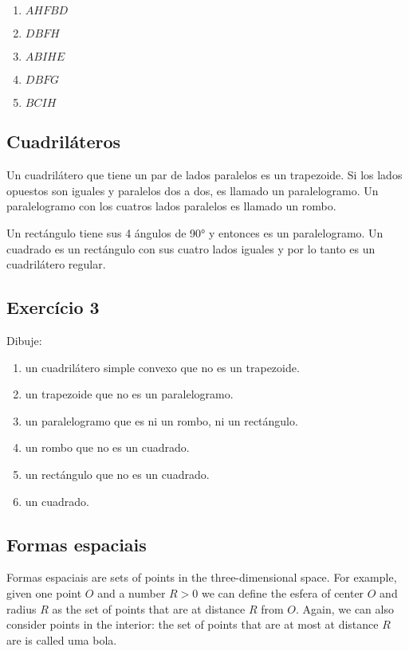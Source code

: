 \begin{enumerate}
  \item $AHFBD$
  \item $DBFH$
  \item $ABIHE$
  \item $DBFG$
  \item $BCIH$
\end{enumerate}

\subsection*{Cuadriláteros}

Un cuadrilátero que tiene un par de lados paralelos es un trapezoide. Si
los lados opuestos son iguales y paralelos dos a dos, es llamado un
paralelogramo. Un paralelogramo con los cuatros lados paralelos es llamado
un rombo.

Un rectángulo tiene sus 4 ángulos de 90° y entonces es un
paralelogramo. Un cuadrado es un rectángulo con sus cuatro lados iguales y
por lo tanto es un cuadrilátero regular.

\subsection*{Exercício 3}

Dibuje:

\begin{enumerate}
\item un cuadrilátero simple convexo que no es un trapezoide.
\item un trapezoide que no es un paralelogramo.
\item un paralelogramo que es ni un rombo, ni un rectángulo.
\item un rombo que no es un cuadrado.
\item un rectángulo que no es un cuadrado.
\item un cuadrado.
\end{enumerate}

\subsection*{Formas espaciais}

Formas espaciais are sets of points in the three-dimensional space. For example,
given one point $O$ and a number $R > 0$ we can define the esfera
of center $O$ and radius $R$ as the set of points that are at distance $R$ from
$O$. Again, we can also consider points in the interior: the set of points
that are at most at distance $R$ are is called uma bola.

